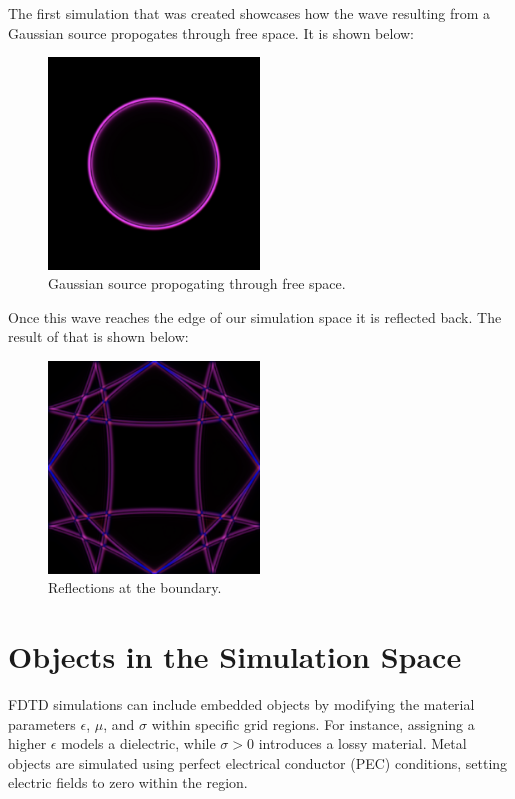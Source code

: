 \documentclass[12pt]{article}
\begin{document}
\begin{spacing}{1.5}
The first simulation that was created showcases how the wave resulting from a Gaussian source propogates through free space. It is shown below:

\begin{figure}[h!]
    \centering
    \includegraphics[width=0.5\textwidth]{images/sim0}
    \caption{Gaussian source propogating through free space.}
    \label{fig:sim0}
\end{figure}

\FloatBarrier

Once this wave reaches the edge of our simulation space it is reflected back. The result of that is shown below:

\begin{figure}[h!]
    \centering
    \includegraphics[width=0.5\textwidth]{images/sim1}
    \caption{Reflections at the boundary.}
    \label{fig:sim1}
\end{figure}

\FloatBarrier

\section{Objects in the Simulation Space}
FDTD simulations can include embedded objects by modifying the material parameters $\epsilon$, $\mu$, and $\sigma$ within specific grid regions. For instance, assigning a higher $\epsilon$ models a dielectric, while $\sigma > 0$ introduces a lossy material. Metal objects are simulated using perfect electrical conductor (PEC) conditions, setting electric fields to zero within the region.


\end{spacing}
\end{document}
